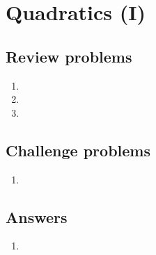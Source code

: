 \section{Quadratics (I)}

\subsection{Review problems}

\begin{enumerate}
\item %
\item %
\item %
\end{enumerate}


\subsection{Challenge problems}

\begin{enumerate}[resume]
\item %
\end{enumerate}


\newpage
\subsection{Answers}

\begin{enumerate}
\item 
\end{enumerate}